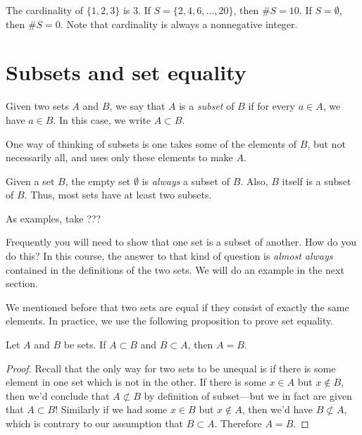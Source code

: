 \documentclass{tufte-book}
\begin{document}
The cardinality of $\{1, 2, 3\}$ is 3. If $S = \{2, 4, 6, \dots, 20\}$, then $\# S = 10$. If $S = \emptyset$, then $\# S = 0$. Note that cardinality is always a nonnegative integer. 



\section{Subsets and set equality}
\label{sec:subsets}

\begin{definition}
  Given two sets $A$ and $B$, we say that $A$ is a \emph{subset}  of $B$ if for every $a \in A$, we have $a \in B$. In this case, we write $A \subset B$. 
\end{definition}
One way of thinking of subsets is one takes some of the elements of $B$, but not necessarily all, and uses only these elements to make $A$.

Given a set $B$, the empty set $\emptyset$ is \emph{always} a subset of $B$. Also, $B$ itself is a subset of $B$. Thus, most sets have at least two subsets.

As examples, take ???

Frequently you will need to show that one set is a subset of another. How do you do this? In this course, the answer to that kind of question is \emph{almost always} contained in the definitions of the two sets. We will do an example in the next section.

We mentioned before that two sets are equal if they consist of exactly the same elements. In practice, we use the following proposition to prove set equality.
\begin{proposition}
  Let $A$ and $B$ be sets. If $A \subset B$ and $B \subset A$, then $A = B$. 
\end{proposition}

\begin{proof}
  Recall that the only way for two sets to be unequal is if there is some element in one set which is not in the other. If there is some $x \in A$ but $x \notin B$, then we'd conclude that $A \not\subset B$ by definition of subset---but we in fact are given that $A \subset B$! Similarly if we had some $x \in B$ but $x \notin A$, then we'd have $B \not\subset A$, which is contrary to our assumption that $B \subset A$. Therefore $A = B$.
\end{proof}
\end{document}
